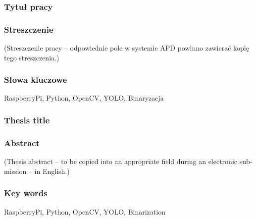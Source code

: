 \documentclass[a4paper,twoside,12pt]{book}
\begin{document}


\cleardoublepage

\rmfamily\normalfont
\pagestyle{empty}



\subsubsection*{Tytuł pracy} 
\Title

\subsubsection*{Streszczenie}  
(Streszczenie pracy – odpowiednie pole w systemie APD powinno zawierać kopię tego streszczenia.)

\subsubsection*{Słowa kluczowe} 
RaspberryPi, Python, OpenCV, YOLO, Binaryzacja

\subsubsection*{Thesis title} 
\begin{otherlanguage}{british}
\TitleAlt
\end{otherlanguage}

\subsubsection*{Abstract} 
\begin{otherlanguage}{british}
(Thesis abstract – to be copied into an appropriate field during an electronic submission – in English.)
\end{otherlanguage}
\subsubsection*{Key words}  
\begin{otherlanguage}{british}
RaspberryPi, Python, OpenCV, YOLO, Binarization
\end{otherlanguage}
\end{document}
